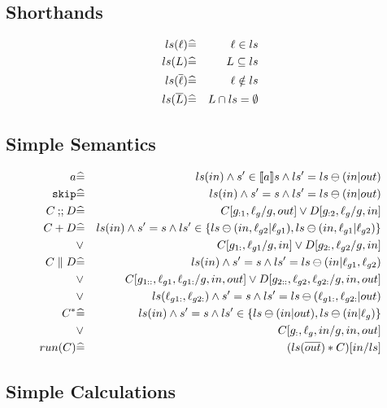 \subsection{Shorthands}

\begin{eqnarray*}
   ls(\ell) &\widehat=& \ell \in ls
\\ ls(L) &\widehat=& L \subseteq ls
\\ ls(\overline{\ell}) &\widehat=& \ell \notin ls
\\ ls(\overline{L}) &\widehat=& L \cap ls = \emptyset
\end{eqnarray*}

\subsection{Simple Semantics}


\begin{eqnarray*}
   a
   &\widehat=&
   ls(in) \land s' \in [\![{a}]\!] s \land ls'=ls \ominus (in|out)
\\ \texttt{skip}
   &\widehat=&
   ls(in) \land s' = s \land ls'=ls \ominus (in|out)
\\ C \mathbin{;\!;} D
   &\widehat=&
   C[g_{:1},\ell_g/g,out] \lor D[g_{:2},\ell_g/g,in]
\\ C + D
   &\widehat=&
   ls(in)
   \land s' = s
   \land ls' \in \{ ls \ominus (in,\ell_{g2}|\ell_{g1})
                  , ls \ominus (in,\ell_{g1}|\ell_{g2})\}
\\ &\lor&
   C[g_{1:},\ell_{g1}/g,in] \lor D[g_{2:},\ell_{g2}/g,in]
\\ C \parallel D
   &\widehat=&
   ls(in)
   \land s' = s
   \land ls'= ls \ominus (in|\ell_{g1},\ell_{g2})
\\ &\lor&
   C[g_{1::},\ell_{g1},\ell_{g1:}/g,in,out]
   \lor D[g_{2::},\ell_{g2},\ell_{g2:}/g,in,out]
\\ &\lor&
   ls(\ell_{g1:},\ell_{g2:})
   \land s' = s
   \land ls'= ls \ominus (\ell_{g1:},\ell_{g2:}|out)
\\ C^*
   &\widehat=&
   ls(in)
   \land s' = s
   \land ls' \in \{ ls \ominus (in|out), ls \ominus (in|\ell_g)\}
\\ &\lor&
   C[g_{:},\ell_g,in/g,in,out]
\\ run(C)
   &\widehat=&
   ( ls(\overline{out}) * C)[in/ls]
\end{eqnarray*}

\subsection{Simple Calculations}

